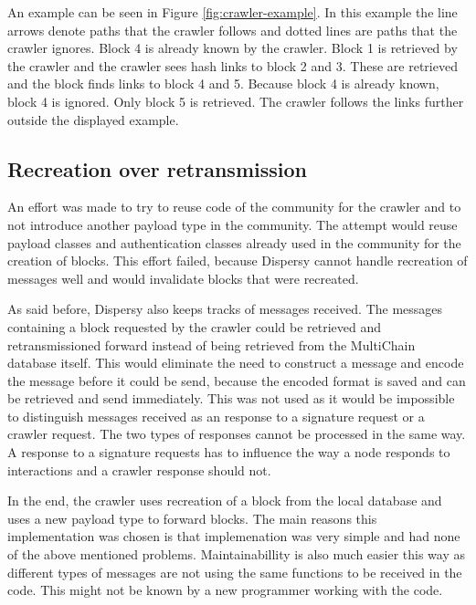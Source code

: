 An example can be seen in Figure \ref{fig:crawler-example}.
In this example the line arrows denote paths that the crawler follows
and dotted lines are paths that the crawler ignores.
Block 4 is already known by the crawler.
Block 1 is retrieved by the crawler and the crawler sees hash links to block 2 and 3.
These are retrieved and the block finds links to block 4 and 5.
Because block 4 is already known, block 4 is ignored.
Only block 5 is retrieved.
The crawler follows the links further outside the displayed example.

\subsection{Recreation over retransmission}
An effort was made to try to reuse code of the community for the crawler and to not introduce another payload type in the community.
The attempt would reuse payload classes and authentication classes already used in the community for the creation of blocks.
This effort failed, because Dispersy cannot handle recreation of messages well
and would invalidate blocks that were recreated.

As said before, Dispersy also keeps tracks of messages received.
The messages containing a block requested by the crawler could be retrieved and retransmissioned forward
instead of being retrieved from the MultiChain database itself.
This would eliminate the need to construct a message and encode the message before it could be send,
because the encoded format is saved and can be retrieved and send immediately.
This was not used as it would be impossible to distinguish messages received as an response to a signature request or a crawler request.
The two types of responses cannot be processed in the same way.
A response to a signature requests has to influence the way a node responds to interactions
and a crawler response should not.

In the end, the crawler uses recreation of a block from the local database and uses a new payload type to forward blocks.
The main reasons this implementation was chosen is
that implemenation was very simple and had none of the above mentioned problems.
Maintainabillity is also much easier this way
as different types of messages are not using the same functions to be received in the code.
This might not be known by a new programmer working with the code.

